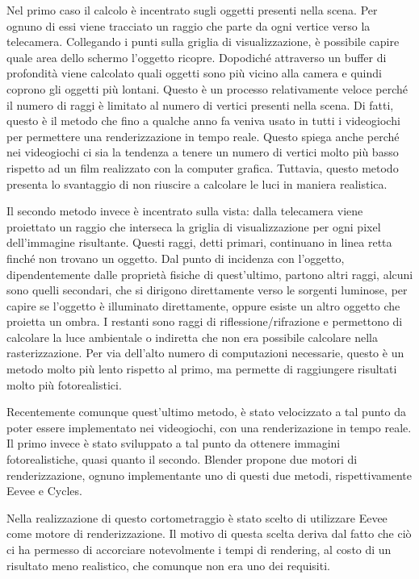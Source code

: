 Nel primo caso il calcolo è incentrato sugli oggetti presenti nella scena. Per ognuno di essi viene tracciato un raggio che parte da ogni vertice verso la telecamera.
Collegando i punti sulla griglia di visualizzazione, è possibile capire quale area dello schermo l'oggetto ricopre.
Dopodiché attraverso un buffer di profondità viene calcolato quali oggetti sono più vicino alla camera e quindi coprono gli oggetti più lontani.
Questo è un processo relativamente veloce perché il numero di raggi è limitato al numero di vertici presenti nella scena.
Di fatti, questo è il metodo che fino a qualche anno fa veniva usato in tutti i videogiochi per permettere una renderizzazione in tempo reale.
Questo spiega anche perché nei videogiochi ci sia la tendenza a tenere un numero di vertici molto più basso rispetto ad un film realizzato con la computer grafica.
Tuttavia, questo metodo presenta lo svantaggio di non riuscire a calcolare le luci in maniera realistica.

Il secondo metodo invece è incentrato sulla vista: dalla telecamera viene proiettato un raggio che interseca la griglia di visualizzazione per ogni pixel dell'immagine risultante.
Questi raggi, detti primari, continuano in linea retta finché non trovano un oggetto.
Dal punto di incidenza con l'oggetto, dipendentemente dalle proprietà fisiche di quest'ultimo, partono altri raggi, alcuni sono quelli secondari, che si dirigono direttamente verso le sorgenti luminose, per capire se l'oggetto è illuminato direttamente, oppure esiste un altro oggetto che proietta un ombra.
I restanti sono raggi di riflessione/rifrazione e permettono di calcolare la luce ambientale o indiretta che non era possibile calcolare nella rasterizzazione.
Per via dell'alto numero di computazioni necessarie, questo è un metodo molto più lento rispetto al primo, ma permette di raggiungere risultati molto più fotorealistici.

Recentemente comunque quest'ultimo metodo, è stato velocizzato a tal punto da poter essere implementato nei videogiochi, con una renderizazione in tempo reale.
Il primo invece è stato sviluppato a tal punto da ottenere immagini fotorealistiche, quasi quanto il secondo.
Blender propone due motori di renderizzazione, ognuno implementante uno di questi due metodi, rispettivamente Eevee e Cycles.

Nella realizzazione di questo cortometraggio è stato scelto di utilizzare Eevee come motore di renderizzazione. 
Il motivo di questa scelta deriva dal fatto che ciò ci ha permesso di accorciare notevolmente i tempi di rendering, al costo di un risultato meno realistico, che comunque non era uno dei requisiti.